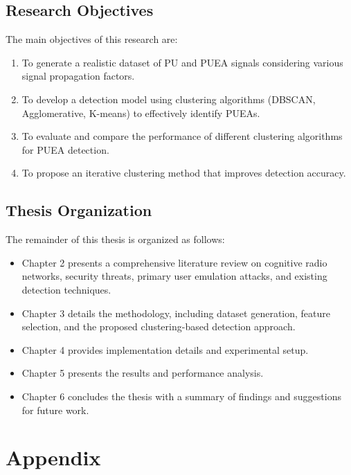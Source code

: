 \documentclass[12pt,a4paper]{report}
\begin{document}
\section{Research Objectives}
The main objectives of this research are:
\begin{enumerate}
    \item To generate a realistic dataset of PU and PUEA signals considering various signal propagation factors.
    \item To develop a detection model using clustering algorithms (DBSCAN, Agglomerative, K-means) to effectively identify PUEAs.
    \item To evaluate and compare the performance of different clustering algorithms for PUEA detection.
    \item To propose an iterative clustering method that improves detection accuracy.
\end{enumerate}

\section{Thesis Organization}
The remainder of this thesis is organized as follows:
\begin{itemize}
    \item Chapter 2 presents a comprehensive literature review on cognitive radio networks, security threats, primary user emulation attacks, and existing detection techniques.
    \item Chapter 3 details the methodology, including dataset generation, feature selection, and the proposed clustering-based detection approach.
    \item Chapter 4 provides implementation details and experimental setup.
    \item Chapter 5 presents the results and performance analysis.
    \item Chapter 6 concludes the thesis with a summary of findings and suggestions for future work.
\end{itemize}







\appendix
\chapter{Appendix}


% 
\end{document}
